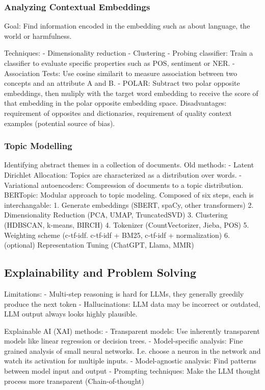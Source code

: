 \documentclass{scrartcl}
\begin{document}
\subsubsection*{Analyzing Contextual Embeddings}
Goal: Find information encoded in the embedding such as about language, the world or harmfulness.

Techniques:
- Dimensionality reduction
- Clustering
- Probing classifier: Train a classifier to evaluate specific properties such as POS, sentiment or NER.
- Association Tests: Use cosine similarit to measure association between two concepts and an attribute A and B.
- POLAR: Subtract two polar opposite embeddings, then muliply with the target word embedding to receive the score of that embedding in the polar opposite embedding space. Disadvantages: requirement of opposites and dictionaries, requirement of quality context examples (potential source of bias).

\subsubsection*{Topic Modelling}
Identifying abstract themes in a collection of documents.
Old methods:
- Latent Dirichlet Allocation: Topics are characterized as a distribution over words.
- Variational autoencoders: Compression of documents to a topic distribution.
BERTopic:
Modular approach to topic modeling. Composed of six steps, each is interchangable:
1. Generate embeddings (SBERT, spaCy, other transformers)
2. Dimensionality Reduction (PCA, UMAP, TruncatedSVD)
3. Clustering (HDBSCAN, k-means, BIRCH)
4. Tokenizer (CountVectorizer, Jieba, POS)
5. Weighting scheme (c-tf-idf. c-tf-idf + BM25, c-tf-idf + normalization)
6. (optional) Representation Tuning (ChatGPT, Llama, MMR)

\subsection{Explainability and Problem Solving}
Limitations:
- Multi-step reasoning is hard for LLMs, they generally greedily produce the next token
- Hallucinations: LLM data may be incorrect or outdated, LLM output always looks highly plausible.

Explainable AI (XAI) methods:
- Transparent models: Use inherently transparent models like linear regression or decision trees.
- Model-specific analysis: Fine grained analysis of small neural networks. I.e. choose a neuron in the network and watch its activation for multiple inputs.
- Model-agnostic analysis: Find patterns between model input and output
- Prompting techniques: Make the LLM thought process more transparent (Chain-of-thought)
\end{document}
